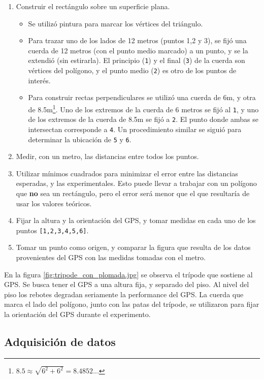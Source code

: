 \documentclass[main]{subfiles}
\begin{document}
\begin{enumerate}
\item Construir el rectángulo sobre un superficie plana.
  \begin{itemize}
  \item Se utilizó pintura para marcar los vértices del triángulo.
  \item Para trazar uno de los lados de 12 metros (puntos 1,2 y 3), se fijó una cuerda de 12 metros (con el punto medio marcado) a un punto, y se la extendió (sin estirarla). El principio (\verb+1+) y el final (\verb+3+) de la cuerda son vértices del polígono, y el punto medio (\verb+2+) es otro de los puntos de interés.
  \item Para construir rectas perpendiculares se utilizó una cuerda de 6m, y otra de 8.5m\footnote{$8.5 \approx \sqrt{6^2 + 6^2} = 8.4852...$}. Uno de los extremos de la cuerda de 6 metros se fijó al \verb+1+, y uno de los extremos de la cuerda de 8.5m se fijó a \verb+2+. El punto donde ambas se intersectan corresponde a \verb+4+. Un procedimiento similar se siguió para determinar la ubicación de \verb+5+ y \verb+6+.
  \end{itemize}
\item Medir, con un metro, las distancias entre todos los puntos.
\item Utilizar mínimos cuadrados para minimizar el error entre las distancias esperadas, y las experimentales. Esto puede llevar a trabajar con un polígono que \textbf{no} sea un rectángulo, pero el error será menor que el que resultaría de usar los valores teóricos.
\item Fijar la altura y la orientación del GPS, y tomar medidas en cada uno de los puntos \verb+[1,2,3,4,5,6]+.
\item Tomar un punto como origen, y comparar la figura que resulta de los datos provenientes del GPS con las medidas tomadas con el metro.
\end{enumerate}

En la figura \ref{fig:tripode_con_plomada.jpg} se observa el trípode que sostiene al GPS. Se busca tener el GPS a una altura fija, y separado del piso. Al nivel del piso los rebotes degradan seriamente la performance del GPS. La cuerda que marca el lado del polígono, junto con las patas del trípode, se utilizaron para fijar la orientación del GPS durante el experimento.

\subsection{Adquisición de datos}
\label{sec:adquisicion-de-datos}
\end{document}
